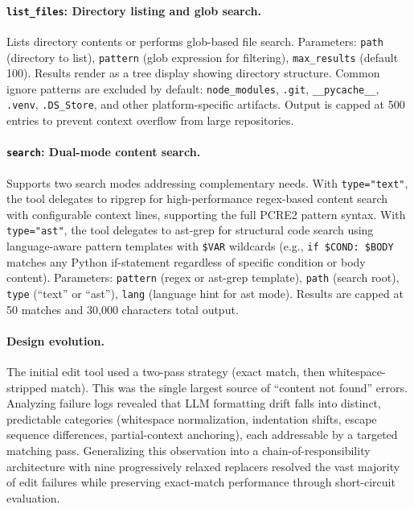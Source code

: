 \paragraph{\texttt{list\_files}: Directory listing and glob search.} Lists directory contents or performs glob-based file search. Parameters: \texttt{path} (directory to list), \texttt{pattern} (glob expression for filtering), \texttt{max\_results} (default 100). Results render as a tree display showing directory structure. Common ignore patterns are excluded by default: \texttt{node\_modules}, \texttt{.git}, \texttt{\_\_pycache\_\_}, \texttt{.venv}, \texttt{.DS\_Store}, and other platform-specific artifacts. Output is capped at 500 entries to prevent context overflow from large repositories.

\paragraph{\texttt{search}: Dual-mode content search.} Supports two search modes addressing complementary needs. With \texttt{type="text"}, the tool delegates to ripgrep for high-performance regex-based content search with configurable context lines, supporting the full PCRE2 pattern syntax. With \texttt{type="ast"}, the tool delegates to ast-grep for structural code search using language-aware pattern templates with \texttt{\$VAR} wildcards (e.g., \texttt{if \$COND: \$BODY} matches any Python if-statement regardless of specific condition or body content). Parameters: \texttt{pattern} (regex or ast-grep template), \texttt{path} (search root), \texttt{type} (``text'' or ``ast''), \texttt{lang} (language hint for ast mode). Results are capped at 50 matches and 30,000 characters total output.

\paragraph{Design evolution.} The initial edit tool used a two-pass strategy (exact match, then whitespace-stripped match). This was the single largest source of ``content not found'' errors. Analyzing failure logs revealed that LLM formatting drift falls into distinct, predictable categories (whitespace normalization, indentation shifts, escape sequence differences, partial-context anchoring), each addressable by a targeted matching pass. Generalizing this observation into a chain-of-responsibility architecture with nine progressively relaxed replacers resolved the vast majority of edit failures while preserving exact-match performance through short-circuit evaluation.

